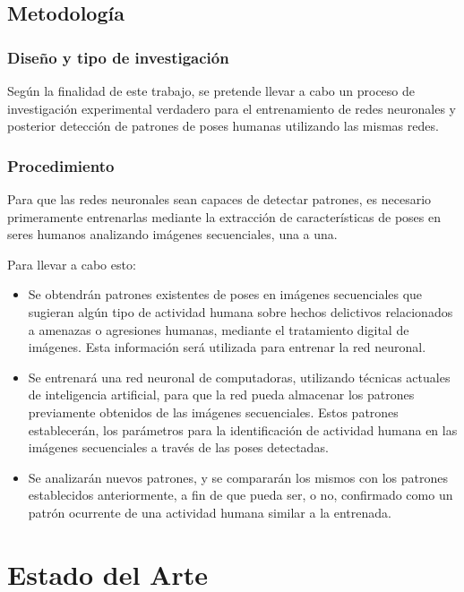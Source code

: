 \documentclass[a4paper,12pt,oneside,spanish]{book}
\begin{document}
\section{Metodología}
\subsection{Diseño y tipo de investigación
}
Según la finalidad de este trabajo, se pretende llevar a cabo un proceso de investigación experimental verdadero para el entrenamiento de redes neuronales y posterior detección de patrones de poses humanas utilizando las mismas redes.
\par

\subsection{Procedimiento}
Para que las redes neuronales sean capaces de detectar patrones, es necesario primeramente entrenarlas mediante la extracción de características de poses en seres humanos analizando imágenes secuenciales, una a una. \par

Para llevar a cabo esto:
\par
\begin{itemize}
	\item Se obtendrán patrones existentes de poses en imágenes secuenciales que sugieran algún tipo de actividad humana sobre hechos delictivos relacionados a amenazas o agresiones humanas, mediante el tratamiento digital de imágenes. Esta información será utilizada para entrenar la red neuronal.\par
	\item Se entrenará una red neuronal de computadoras, utilizando técnicas actuales de inteligencia artificial, para que la red pueda almacenar los patrones previamente obtenidos de las imágenes secuenciales. Estos patrones establecerán, los parámetros para la identificación de actividad humana en las imágenes secuenciales a través de las poses detectadas.\par	
	\item Se analizarán nuevos patrones, y se compararán los mismos con los patrones establecidos anteriormente, a fin de que pueda ser, o no, confirmado como un patrón ocurrente de una actividad humana similar a la entrenada.\par	
\end{itemize}

\newpage
\chapter{Estado del Arte}
\end{document}
